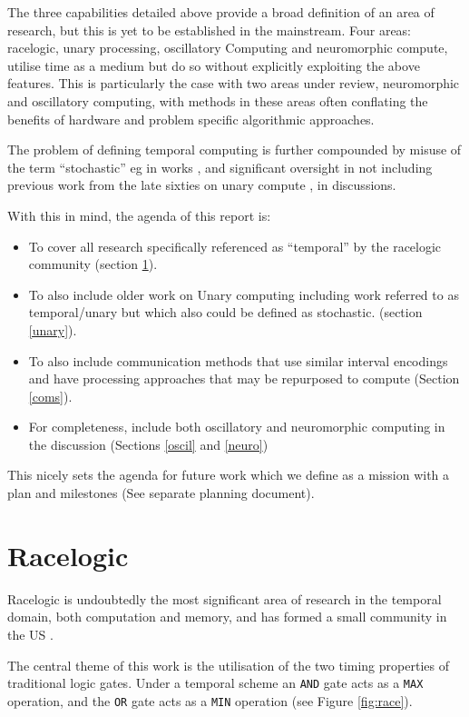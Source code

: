 \documentclass{article}
\begin{document}
The three capabilities detailed above provide a broad definition of an area of research, but this is yet to be established in the mainstream. Four areas: racelogic, unary processing, oscillatory Computing and neuromorphic compute, utilise time as a medium but do so without explicitly exploiting the above features. This is particularly the case with two areas under review, neuromorphic and oscillatory computing, with methods in these areas often conflating the benefits of hardware and problem specific algorithmic approaches.

The problem of defining temporal computing is further compounded by misuse of the term ``stochastic'' eg in works \cite{wu2020ugemm,wu2023power}, and significant oversight in not including previous work from the late sixties on unary compute \cite{POPPELBAUM198747}, in discussions. 

With this in mind, the agenda of this report is:
\begin{itemize}
  \item To cover all research specifically referenced as ``temporal'' by the racelogic community (section \ref{race}).
  \item To also include older work on Unary computing including work referred to as temporal/unary but which also could be defined as stochastic. (section \ref{unary}).
  \item To also include communication methods that use similar interval encodings and have processing approaches that may be repurposed to compute (Section \ref{coms}). 
  \item For completeness, include both oscillatory and neuromorphic computing in the discussion (Sections \ref{oscil} and \ref{neuro})
\end{itemize}

This nicely sets the agenda for future work which we define as a mission with a plan and milestones (See separate planning document). 

\section{Racelogic} \label{race}
Racelogic is undoubtedly the most significant area of research in the temporal domain, both computation and memory, and has formed a small community in the US \cite{madhavan2014race}.

The central theme of this work is the utilisation of the two timing properties of traditional logic gates. Under a temporal scheme an \texttt{AND} gate acts as a \texttt{MAX} operation, and the \texttt{OR} gate acts as a \texttt{MIN} operation (see Figure \ref{fig:race}).
\end{document}
